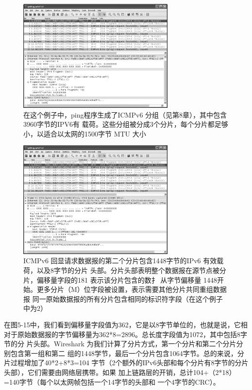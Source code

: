 \begin{figure}[!htb]
    \centering
	\includegraphics[width=0.7\textwidth]{imgs/5/5-13.png}
	\caption{在这个例子中，ping程序生成了ICMPv6 分组（见第8章），其中包含3960字节的IPV6有
            载荷。这些分组被分成3个分片，每个分片都足够小，以适合以太网的1500字节 MTU 大小}
\end{figure}

\begin{figure}[!htb]
    \centering
	\includegraphics[width=0.7\textwidth]{imgs/5/5-14.png}
	\caption{ICMPv6 回显请求数据报的第二个分片包含1448字节的IPv6 有效载荷，以及8字节的分片
            头部。分片头部表明整个数据报在源节点被分片，偏移量字段的181 表示该分片包含的数扌
            从字节偏移量 1448开始。更多分片（M）位字段被设置，表示需要其他分片共同重组数据报
            同一原始数据报的所有分片包含相同的标识符字段（在这个例子中为2）}
\end{figure}

在图5-15中，我们看到偏移量字段值为362，它是以8字节单位的，也就是说，它相
对于原始数据报的字节偏移量为362*8=2896。总长度字段值为1072，其中包括8字节的分
片头部。Wireshark 为我们计算了分片方式，第一个分片和第二个分片分别包含第一组和第二
组的1448学节，最后一个分片包含1064字节。总的来说，分片过程增加了40*2+8*3=104
字节（2个额外的IPv6头部和每个分片有8字节的分片头部），它们需要由网络层携带。如果
加上链路层的开销，总计104+（2*18）=140字节（每个以太网帧包括一个14字节的头部和
一个4字节的CRC）。

